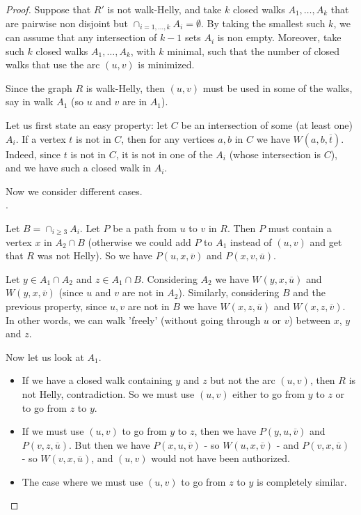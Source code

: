 \documentclass[10pt,a4paper]{amsart}
\begin{document}
\begin{proof}
Suppose that $R'$ is not walk-Helly, and take $k$ closed walks $A_1,\dots,A_k$ that are pairwise non disjoint but $\cap_{i=1,\dots,k} A_i=\emptyset$. By taking the smallest such $k$, we can assume that any intersection of $k-1$ sets $A_i$ is non empty. Moreover, take such $k$ closed walks $A_1,\dots,A_k$, with $k$ minimal, such that the number of closed walks that use the arc $(u,v)$ is minimized. 

Since the graph $R$ is walk-Helly, then $(u,v)$ must be used in some of the walks, say in walk $A_1$ (so $u$ and $v$ are in $A_1$).

Let us first state an easy property: let $C$ be an intersection of some (at least one) $A_i$. If a vertex $t$ is not in $C$, then for any vertices $a,b$ in $C$ we have $W(a,b,\overline{t})$. Indeed, since $t$ is not in $C$, it is not in one of the $A_i$ (whose intersection is $C$), and we have such a closed walk in $A_i$.

Now we consider different cases.\\

.

Let $B=\cap_{i\geq 3} A_i$. Let $P$ be a path from $u$ to $v$ in $R$. Then $P$ must contain a vertex $x$ in $A_2\cap B$ (otherwise we could add $P$ to $A_1$ instead of $(u,v)$ and get that $R$ was not Helly). So we have $P(u,x,\overline{v})$ and $P(x,v,\overline{u})$.

Let $y \in A_1\cap A_2$ and $z\in A_1\cap B$. Considering $A_2$ we have $W(y,x,\overline{u})$ and $W(y,x,\overline{v})$ (since $u$ and $v$ are not in $A_2$). Similarly, considering $B$ and the previous property, since $u,v$ are not in $B$ we have $W(x,z,\overline{u})$ and $W(x,z,\overline{v})$. In other words, we can walk 'freely' (without going through $u$ or $v$) between $x$, $y$ and $z$.
 
Now let us look at $A_1$. 
\begin{itemize}
	\item If we have a closed walk containing $y$ and $z$ but not the arc $(u,v)$, then $R$ is not Helly, contradiction. So we must use $(u,v)$ either to go from $y$ to $z$ or to go from $z$ to $y$.
	\item If we must use $(u,v)$ to go from $y$ to $z$, then we have $P(y,u,\overline{v})$ and $P(v,z,\overline{u})$. But then 
we have $P(x,u,\overline{v})$ - so $W(u,x,\overline{v})$ -  and $P(v,x,\overline{u})$ - so $W(v,x,\overline{u})$, and $(u,v)$ would not have been authorized.
	\item  The case where we must use $(u,v)$ to go from $z$ to $y$ is completely similar.\\
\end{itemize}
 

\end{proof}
\end{document}
